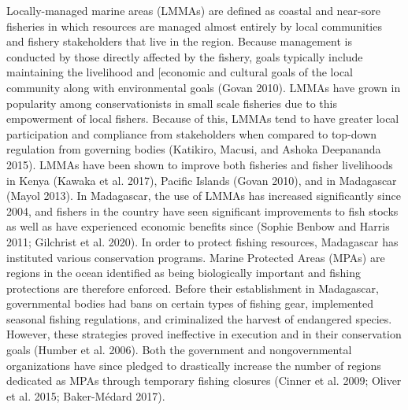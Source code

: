 \documentclass[
]{article}
\begin{document}
Locally-managed marine areas (LMMAs) are defined as coastal and near-sore fisheries in which resources are managed almost entirely by local communities and fishery stakeholders that live in the region. Because management is conducted by those directly affected by the fishery, goals typically include maintaining the livelihood and {[}economic and cultural goals of the local community along with environmental goals (Govan 2010). LMMAs have grown in popularity among conservationists in small scale fisheries due to this empowerment of local fishers. Because of this, LMMAs tend to have greater local participation and compliance from stakeholders when compared to top-down regulation from governing bodies (Katikiro, Macusi, and Ashoka Deepananda 2015). LMMAs have been shown to improve both fisheries and fisher livelihoods in Kenya (Kawaka et al. 2017), Pacific Islands (Govan 2010), and in Madagascar (Mayol 2013). In Madagascar, the use of LMMAs has increased significantly since 2004, and fishers in the country have seen significant improvements to fish stocks as well as have experienced economic benefits since (Sophie Benbow and Harris 2011; Gilchrist et al. 2020). In order to protect fishing resources, Madagascar has instituted various conservation programs. Marine Protected Areas (MPAs) are regions in the ocean identified as being biologically important and fishing protections are therefore enforced. Before their establishment in Madagascar, governmental bodies had bans on certain types of fishing gear, implemented seasonal fishing regulations, and criminalized the harvest of endangered species. However, these strategies proved ineffective in execution and in their conservation goals (Humber et al. 2006). Both the government and nongovernmental organizations have since pledged to drastically increase the number of regions dedicated as MPAs through temporary fishing closures (Cinner et al. 2009; Oliver et al. 2015; Baker-Médard 2017).
\end{document}
